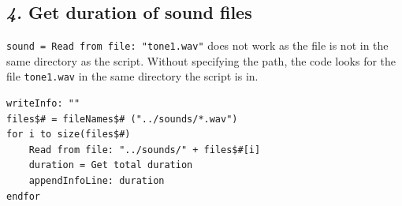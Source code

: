 \documentclass[12pt, english]{article}
\newenvironment{myindent}
{\par\leftskip25pt\relax\rightskip25pt\relax}
{\par\leftskip0cm\relax\rightskip0cm\relax}
\begin{document}
\subsection*{\emph{4.} Get duration of sound files}

\begin{myindent}
    \texttt{sound = Read from file: "tone1.wav"} does not work as the file is not in the same directory as the script. Without specifying the path, the code looks for the file \texttt{tone1.wav} in the same directory the script is in.
\end{myindent}
\vspace{10pt}

\begin{lstlisting}
writeInfo: ""
files$# = fileNames$# ("../sounds/*.wav")
for i to size(files$#)
	Read from file: "../sounds/" + files$#[i]
	duration = Get total duration
	appendInfoLine: duration
endfor
\end{lstlisting}

\end{document}

